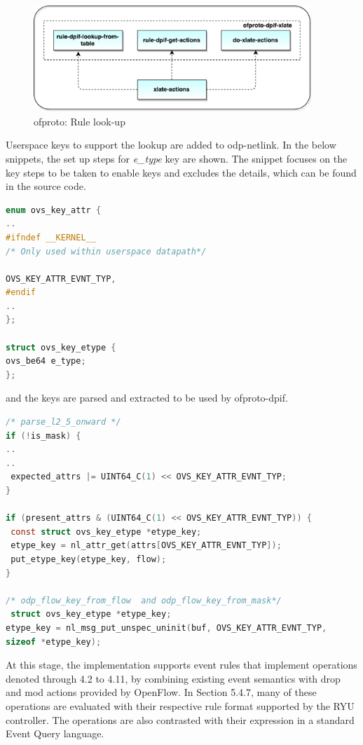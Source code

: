 \begin{figure}[H]
 \centering
 \caption{ofproto: Rule look-up}
 \includegraphics[height=4cm]{ofproto-dpif-xlate.pdf}
\end{figure}

Userspace keys to support the lookup are added to odp-netlink. In the below snippets, the set up steps for \textit{e_type} key are shown. The snippet focuses on the key steps to be taken to enable keys and excludes the details, which can be found in the source code. \newline

\begin{lstlisting}[language=c]
enum ovs_key_attr {
..
#ifndef __KERNEL__
/* Only used within userspace datapath*/ 

OVS_KEY_ATTR_EVNT_TYP,
#endif
..
};

struct ovs_key_etype {
ovs_be64 e_type;
};

\end{lstlisting}

and the keys are parsed and extracted to be used by ofproto-dpif. \newline
\begin{lstlisting}[language=c]
/* parse_l2_5_onward */
if (!is_mask) {
..
..
 expected_attrs |= UINT64_C(1) << OVS_KEY_ATTR_EVNT_TYP;
}

if (present_attrs & (UINT64_C(1) << OVS_KEY_ATTR_EVNT_TYP)) {
 const struct ovs_key_etype *etype_key; 
 etype_key = nl_attr_get(attrs[OVS_KEY_ATTR_EVNT_TYP]);
 put_etype_key(etype_key, flow);
}

/* odp_flow_key_from_flow  and odp_flow_key_from_mask*/
 struct ovs_key_etype *etype_key;  
etype_key = nl_msg_put_unspec_uninit(buf, OVS_KEY_ATTR_EVNT_TYP,
sizeof *etype_key); 
\end{lstlisting}

At this stage, the implementation supports event rules that implement operations denoted through 4.2 to 4.11, by combining existing event semantics with drop and mod actions provided by OpenFlow. In Section 5.4.7, many of these operations are evaluated with their respective rule format supported by the RYU controller. The operations are also contrasted with their expression in a standard Event Query language.



